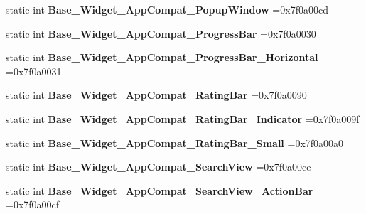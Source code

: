\begin{DoxyCompactItemize}
static int {\bfseries Base\+\_\+\+Widget\+\_\+\+App\+Compat\+\_\+\+Popup\+Window} =0x7f0a00cd
\item 
\mbox{\label{classandroid_1_1support_1_1graphics_1_1drawable_1_1R_1_1style_acff023945661a73a15330ada1383b953}} 
static int {\bfseries Base\+\_\+\+Widget\+\_\+\+App\+Compat\+\_\+\+Progress\+Bar} =0x7f0a0030
\item 
\mbox{\label{classandroid_1_1support_1_1graphics_1_1drawable_1_1R_1_1style_a11926ae7c948518385e6980b7c0ddf03}} 
static int {\bfseries Base\+\_\+\+Widget\+\_\+\+App\+Compat\+\_\+\+Progress\+Bar\+\_\+\+Horizontal} =0x7f0a0031
\item 
\mbox{\label{classandroid_1_1support_1_1graphics_1_1drawable_1_1R_1_1style_afa0538735f666b33d49c1bf12b7af7f3}} 
static int {\bfseries Base\+\_\+\+Widget\+\_\+\+App\+Compat\+\_\+\+Rating\+Bar} =0x7f0a0090
\item 
\mbox{\label{classandroid_1_1support_1_1graphics_1_1drawable_1_1R_1_1style_aadb70f0e7968ac262b3a5a1ddfd290a2}} 
static int {\bfseries Base\+\_\+\+Widget\+\_\+\+App\+Compat\+\_\+\+Rating\+Bar\+\_\+\+Indicator} =0x7f0a009f
\item 
\mbox{\label{classandroid_1_1support_1_1graphics_1_1drawable_1_1R_1_1style_a01329d97754abdbd23bd9e92e2e38983}} 
static int {\bfseries Base\+\_\+\+Widget\+\_\+\+App\+Compat\+\_\+\+Rating\+Bar\+\_\+\+Small} =0x7f0a00a0
\item 
\mbox{\label{classandroid_1_1support_1_1graphics_1_1drawable_1_1R_1_1style_a79edbfc75789355b9347ad219f746676}} 
static int {\bfseries Base\+\_\+\+Widget\+\_\+\+App\+Compat\+\_\+\+Search\+View} =0x7f0a00ce
\item 
\mbox{\label{classandroid_1_1support_1_1graphics_1_1drawable_1_1R_1_1style_a35723ed1f10f3129711ac612616246cc}} 
static int {\bfseries Base\+\_\+\+Widget\+\_\+\+App\+Compat\+\_\+\+Search\+View\+\_\+\+Action\+Bar} =0x7f0a00cf

\end{DoxyCompactItemize}
